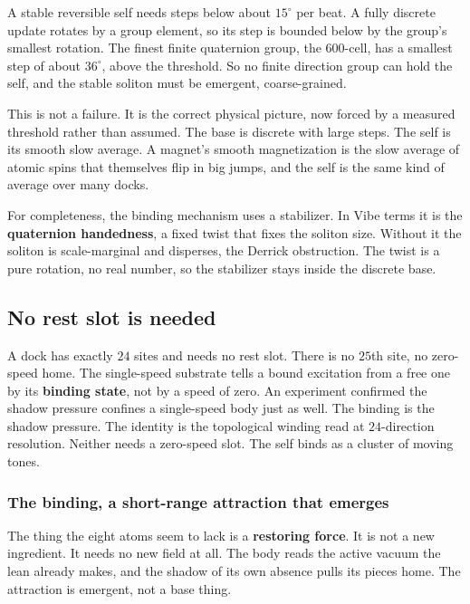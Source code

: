 \begin{theorem}
A stable reversible self needs steps below about $15^\circ$ per beat. A fully discrete update rotates by a group element, so its step is bounded below by the group's smallest rotation. The finest finite quaternion group, the $600$-cell, has a smallest step of about $36^\circ$, above the threshold. So no finite direction group can hold the self, and the stable soliton must be emergent, coarse-grained.
\end{theorem}

This is not a failure. It is the correct physical picture, now forced by a measured threshold rather than assumed. The base is discrete with large steps. The self is its smooth slow average. A magnet's smooth magnetization is the slow average of atomic spins that themselves flip in big jumps, and the self is the same kind of average over many docks.

For completeness, the binding mechanism uses a stabilizer. In Vibe terms it is the \textbf{quaternion handedness}, a fixed twist that fixes the soliton size. Without it the soliton is scale-marginal and disperses, the Derrick obstruction. The twist is a pure rotation, no real number, so the stabilizer stays inside the discrete base.

\subsection{No rest slot is needed}

A dock has exactly $24$ sites and needs no rest slot. There is no $25$th site, no zero-speed home. The single-speed substrate tells a bound excitation from a free one by its \textbf{binding state}, not by a speed of zero. An experiment confirmed the shadow pressure confines a single-speed body just as well. The binding is the shadow pressure. The identity is the topological winding read at $24$-direction resolution. Neither needs a zero-speed slot. The self binds as a cluster of moving tones.

\subsubsection{The binding, a short-range attraction that emerges}

The thing the eight atoms seem to lack is a \textbf{restoring force}. It is not a new ingredient. It needs no new field at all. The body reads the active vacuum the lean already makes, and the shadow of its own absence pulls its pieces home. The attraction is emergent, not a base thing.

